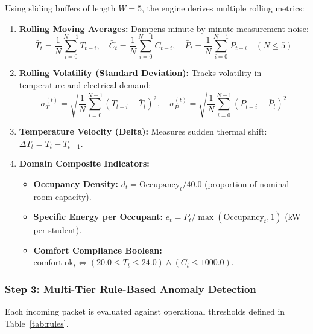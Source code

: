 \documentclass[12pt,a4paper]{article}
\begin{document}
Using sliding buffers of length $W=5$, the engine derives multiple rolling metrics:
\begin{enumerate}
  \item \textbf{Rolling Moving Averages:} Dampens minute-by-minute measurement noise:
  \begin{equation}
    \bar{T}_t = \frac{1}{N}\sum_{i=0}^{N-1} T_{t-i}, \quad
    \bar{C}_t = \frac{1}{N}\sum_{i=0}^{N-1} C_{t-i}, \quad
    \bar{P}_t = \frac{1}{N}\sum_{i=0}^{N-1} P_{t-i} \quad (N \le 5)
  \end{equation}
  \item \textbf{Rolling Volatility (Standard Deviation):} Tracks volatility in temperature and electrical demand:
  \begin{equation}
    \sigma_T^{(t)} = \sqrt{\frac{1}{N}\sum_{i=0}^{N-1} (T_{t-i} - \bar{T}_t)^2}, \quad
    \sigma_P^{(t)} = \sqrt{\frac{1}{N}\sum_{i=0}^{N-1} (P_{t-i} - \bar{P}_t)^2}
  \end{equation}
  \item \textbf{Temperature Velocity (Delta):} Measures sudden thermal shift: $\Delta T_t = T_t - T_{t-1}$.
  \item \textbf{Domain Composite Indicators:}
  \begin{itemize}
    \item \textbf{Occupancy Density:} $d_t = \text{Occupancy}_t / 40.0$ (proportion of nominal room capacity).
    \item \textbf{Specific Energy per Occupant:} $e_t = P_t / \max(\text{Occupancy}_t, 1)$ (kW per student).
    \item \textbf{Comfort Compliance Boolean:} $\text{comfort\_ok}_t \iff (20.0 \le T_t \le 24.0) \land (C_t \le 1000.0)$.
  \end{itemize}
\end{enumerate}

\subsubsection{Step 3: Multi-Tier Rule-Based Anomaly Detection}

Each incoming packet is evaluated against operational thresholds defined in Table~\ref{tab:rules}.
\end{document}
